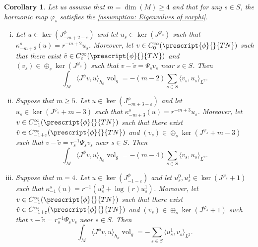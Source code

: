 \documentclass{article}
\numberwithin{equation}{section}        %
\theoremstyle{bfnote}
\newtheorem{cor}[thm]{Corollary}            %
\theoremstyle{definition}
\theoremstyle{bfremark}
\DeclareMathOperator{\vol}{vol}                 %
\begin{document}
\begin{cor}     \label{cor: obstruction pairing}
    Let us assume that $m = \dim(M) \geq 4$ and that for any $s \in S$, the harmonic map $\varphi_s$ satisfies the \cref{assumption: Eigenvalues of varphi}. 
    \begin{enumerate}[(i)]
        \item Let $u \in \ker(J^\phi_{-m+2-\varepsilon})$ and let $u_s \in \ker(J^{\varphi_s})$ such that $\kappa^s_{-m+2}(u) = r^{-m+2} u_s$. Moreover, let $v \in C^\infty_0(\prescript{\phi}{}{TN})$ such that there exist $\tilde v \in C^\infty_\varepsilon(\prescript{\phi}{}{TN})$ and $(v_s) \in \oplus_s \ker(J^{\varphi_s})$ such that $v-\tilde v = \Psi_s v_s$ near $s \in S$. Then
        \begin{equation*}
            \int_M \langle J^\phi v, u \rangle_{h_\phi} \vol_{g} = - (m-2) \sum_{s \in S} \langle v_s, u_s \rangle_{L^2} .
        \end{equation*}

        \item Suppose that $m \geq 5$. Let $u \in \ker(J^\phi_{-m+3-\varepsilon})$ and let $u_s \in \ker(J^{\varphi_s}+m-3)$ such that $\kappa^s_{-m+3}(u) = r^{-m+3} u_s$. Moreover, let $v \in C^\infty_{-1}(\prescript{\phi}{}{TN})$ such that there exist $\tilde v \in C^\infty_{-1+\varepsilon}(\prescript{\phi}{}{TN})$ and $(v_s) \in \oplus_s \ker(J^{\varphi_s}+m-3)$ such that $v-\tilde v = r_s^{-1}\Psi_s v_s$ near $s \in S$. Then
        \begin{equation*}
            \int_M \langle J^\phi v, u \rangle_{h_\phi} \vol_{g} = - (m-4) \sum_{s \in S} \langle v_s, u_s \rangle_{L^2} .
        \end{equation*}

        \item Suppose that $m = 4$. Let $u \in \ker(J^\phi_{-1-\varepsilon})$ and let $u^0_s,u_s^1 \in \ker(J^{\varphi_s}+1)$ such that $\kappa^s_{-1}(u) = r^{-1} (u^0_s+\log(r) u^1_s)$. Moreover, let $v \in C^\infty_{-1}(\prescript{\phi}{}{TN})$ such that there exist $\tilde v \in C^\infty_{-1+\varepsilon}(\prescript{\phi}{}{TN})$ and $(v_s) \in \oplus_s \ker(J^{\varphi_s}+1)$ such that $v-\tilde v = r_s^{-1}\Psi_s v_s$ near $s \in S$. Then
        \begin{equation*}
            \int_M \langle J^\phi v, u \rangle_{h_\phi} \vol_{g} = - \sum_{s \in S} \langle u_s^1, v_s \rangle_{L^2} .
        \end{equation*}
    \end{enumerate}
\end{cor}
\end{document}

